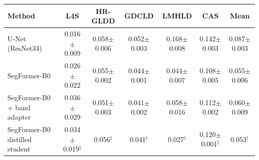 \begin{tabular}{lcccccc}
\toprule
Method & L4S & HR-GLDD & GDCLD & LMHLD & CAS & Mean \\
\midrule
U-Net (ResNet34) & 0.016$\pm$0.009 & 0.058$\pm$0.006 & 0.052$\pm$0.003 & 0.168$\pm$0.008 & 0.142$\pm$0.003 & 0.087$\pm$0.003 \\
SegFormer-B0 & 0.026$\pm$0.022 & 0.055$\pm$0.002 & 0.044$\pm$0.001 & 0.044$\pm$0.007 & 0.108$\pm$0.005 & 0.055$\pm$0.006 \\
SegFormer-B0 + band adapter & 0.036$\pm$0.029 & 0.051$\pm$0.003 & 0.041$\pm$0.002 & 0.058$\pm$0.016 & 0.112$\pm$0.002 & 0.060$\pm$0.009 \\
SegFormer-B0 distilled student & 0.034$\pm$0.019$^\ddagger$ & 0.056$^\dagger$ & 0.041$^\dagger$ & 0.027$^\dagger$ & 0.120$\pm$0.001$^\ddagger$ & 0.053$^\dagger$ \\
\bottomrule
\end{tabular}
